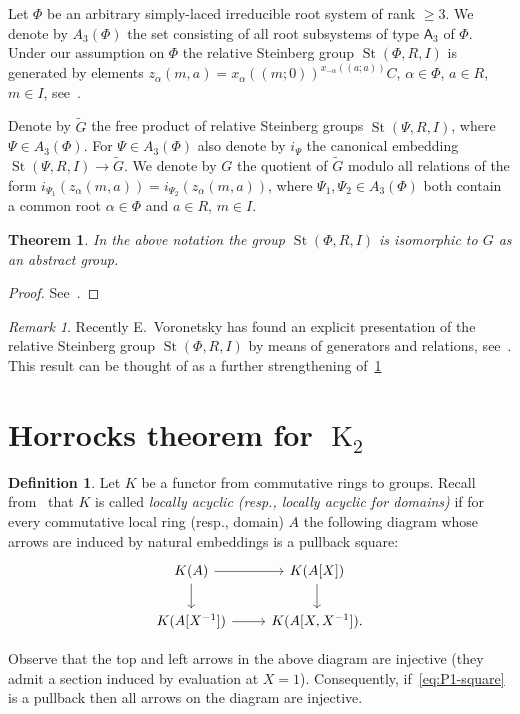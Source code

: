 \documentclass[oneside, 10pt]{amsart}
\DeclareMathOperator{\St}{St}
\DeclareMathOperator{\K}{K}
\newcommand{\rA}{\mathsf{A}}
\newcommand{\inv}{^{-1}}
\newtheorem{thm}{Theorem}
\numberwithin{equation}{section}
\numberwithin{thm}{section}
\numberwithin{lemma}{section}
\theoremstyle{definition}
\newtheorem{dfn}[lemma]{Definition}
\theoremstyle{remark}
\newtheorem{rem}[lemma]{Remark}
\begin{document}
Let $\Phi$ be an arbitrary simply-laced irreducible root system of rank $\geq 3$.
We denote by $A_3(\Phi)$ the set consisting of all root subsystems of type $\rA_3$ of $\Phi$.
Under our assumption on $\Phi$ the relative Steinberg group $\St(\Phi, R, I)$ is generated by elements
$z_\alpha(m, a) = x_\alpha((m; 0))^{x_{-\alpha}((a; a))}C$, $\alpha \in \Phi$, $a \in R$, $m \in I$, see~\cite[\S~3.1]{S15}.

Denote by $\widetilde{G}$ the free product of relative Steinberg groups $\St(\Psi, R, I)$, where $\Psi \in A_3(\Phi)$.
For $\Psi \in A_3(\Phi)$ also denote by $i_\Psi$ the canonical embedding $\St(\Psi, R, I) \to \widetilde{G}$.
We denote by $G$ the quotient of $\widetilde{G}$ modulo all relations of the form $i_{\Psi_1}(z_\alpha(m, a)) = i_{\Psi_2}(z_\alpha(m, a))$,
where $\Psi_1, \Psi_2 \in A_3(\Phi)$ both contain a common root $\alpha \in \Phi$ and $a\in R$, $m \in I$.

\begin{thm}\label{thm:relPres} In the above notation the group $\St(\Phi, R, I)$ is isomorphic to $G$ as an abstract group. \end{thm}
\begin{proof}
See~\cite[\S~2]{LS20}.
\end{proof}

\begin{rem}
Recently E.~Voronetsky has found an explicit presentation of the relative Steinberg group $\St(\Phi, R, I)$
by means of generators and relations, see~\cite{V22}.
This result can be thought of as a further strengthening of~\cref{thm:relPres}
\end{rem}


\section{Horrocks theorem for $\K_2$} \label{sec:horrocks}
\begin{dfn}
Let $K$ be a functor from commutative rings to groups.
Recall from~\cite{LSV2} that $K$ is called \textit{locally acyclic (resp., locally acyclic for domains)} if for every commutative local ring (resp., domain)
$A$ the following diagram whose arrows are induced by natural embeddings is a pullback square:
\begin{equation}\label{eq:P1-square} \begin{tikzcd} K(A) \ar[r] \ar[d] & K(A[X]) \arrow{d} \\ K(A[X\inv]) \ar{r} & K(A[X, X\inv]). \end{tikzcd} \end{equation}
\end{dfn}
Observe that the top and left arrows in the above diagram are injective (they admit a section induced by evaluation at $X=1$).
Consequently, if~\eqref{eq:P1-square} is a pullback then all arrows on the diagram are injective.
\end{document}
